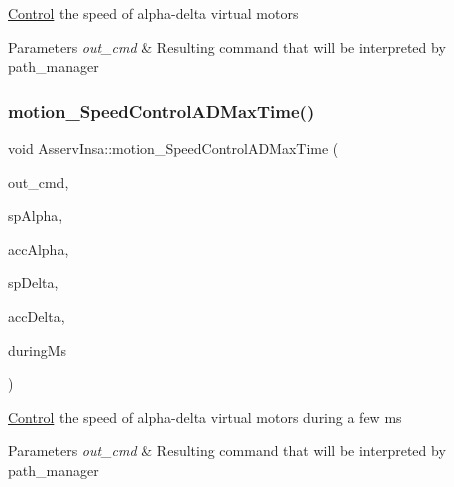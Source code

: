 \hyperlink{classControl}{Control} the speed of alpha-\/delta virtual motors 
\begin{DoxyParams}{Parameters}
{\em out\+\_\+cmd} & Resulting command that will be interpreted by path\+\_\+manager \\
\hline
\end{DoxyParams}
\mbox{\label{classAsservInsa_a949a94fc133abfb6ff87671372a510a8}} 
\subsubsection{\texorpdfstring{motion\+\_\+\+Speed\+Control\+A\+D\+Max\+Time()}{motion\_SpeedControlADMaxTime()}}
{\footnotesize\ttfamily void Asserv\+Insa\+::motion\+\_\+\+Speed\+Control\+A\+D\+Max\+Time (\begin{DoxyParamCaption}\item[{\hyperlink{structRobotCommand}{Robot\+Command} $\ast$}]{out\+\_\+cmd,  }\item[{float}]{sp\+Alpha,  }\item[{float}]{acc\+Alpha,  }\item[{float}]{sp\+Delta,  }\item[{float}]{acc\+Delta,  }\item[{int}]{during\+Ms }\end{DoxyParamCaption})}

\hyperlink{classControl}{Control} the speed of alpha-\/delta virtual motors during a few ms 
\begin{DoxyParams}{Parameters}
{\em out\+\_\+cmd} & Resulting command that will be interpreted by path\+\_\+manager \\
\hline
\end{DoxyParams}
\mbox{\label{classAsservInsa_ae70a0eb3fe9dab42d6fa1537ddcb6b8b}} 
